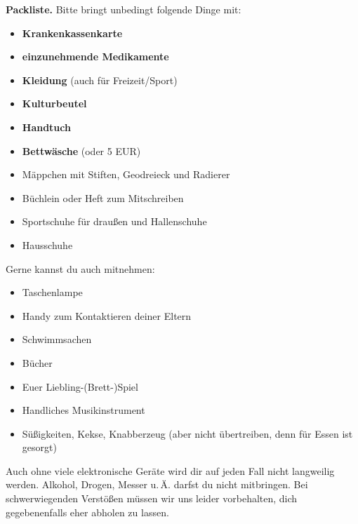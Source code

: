 \documentclass[12pt]{zettel}
\begin{document}
\begin{shaded}
\textbf{Packliste.} Bitte bringt unbedingt folgende Dinge mit:
\begin{multicols}{2}
\begin{itemize}
\item \textbf{Krankenkassenkarte}
\item \textbf{einzunehmende Medikamente}
\item \textbf{Kleidung} (auch für Freizeit/Sport)
\item \textbf{Kulturbeutel}
\item \textbf{Handtuch}
\item \textbf{Bettwäsche} (oder 5 EUR)
\item Mäppchen mit Stiften, Geodreieck und Radierer %
\item Büchlein oder Heft zum Mitschreiben
\item Sportschuhe für draußen und Hallenschuhe
\item Hausschuhe
\end{itemize}
\end{multicols}
Gerne kannst du auch mitnehmen:
\begin{multicols}{2}
\begin{itemize}
\item Taschenlampe
\item Handy zum Kontaktieren deiner Eltern
\item Schwimmsachen
\item Bücher
\item Euer Liebling-(Brett-)Spiel
\item Handliches Musikinstrument
\item Süßigkeiten, Kekse, Knabberzeug (aber nicht übertreiben, denn für Essen
ist gesorgt)
\end{itemize}
\end{multicols}
Auch ohne viele elektronische Geräte wird dir auf jeden Fall nicht langweilig werden.
Alkohol, Drogen, Messer u.\,Ä. darfst du nicht mitbringen. Bei schwerwiegenden Verstößen müssen wir uns leider vorbehalten, dich gegebenenfalls eher abholen zu lassen.
\end{shaded}

\vfill
\end{document}
